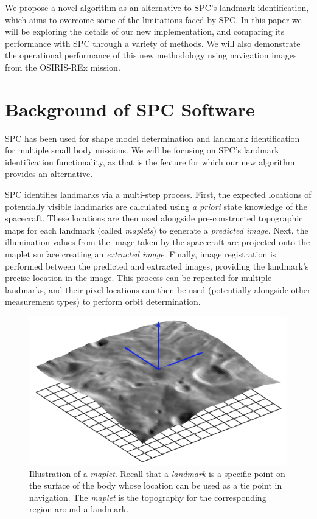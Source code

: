 \documentclass{src/RPI-SIW}
\begin{document}
We propose a novel algorithm as an alternative to SPC's landmark identification, which aims to overcome some of the limitations faced by SPC.  In this paper we will be exploring the details of our new implementation, and comparing its performance with SPC through a variety of methods.  We will also demonstrate the operational performance of this new methodology using navigation images from the OSIRIS-REx mission.

\section*{Background of SPC Software}
SPC has been used for shape model determination and landmark identification for multiple small body missions.\cite{gaskell_nav_overview}  We will be focusing on SPC's landmark identification functionality, as that is the feature for which our new algorithm provides an alternative.

SPC identifies landmarks via a multi-step process.  First, the expected locations of potentially visible landmarks are calculated using \textit{a priori} state knowledge of the spacecraft.  These locations are then used alongside pre-constructed topographic maps for each landmark (called \textit{maplets}) to generate a \textit{predicted image}.  Next, the illumination values from the image taken by the spacecraft are projected onto the maplet surface creating an \textit{extracted image}.  Finally, image registration is performed between the predicted and extracted images, providing the landmark's precise location in the image.  This process can be repeated for multiple landmarks, and their pixel locations can then be used (potentially alongside other measurement types) to perform orbit determination.

\begin{figure}[h]
	\centering
	\includegraphics[width=\columnwidth]{spc_maplet.png}
	\caption{Illustration of a \textit{maplet}.  Recall that a \textit{landmark} is a specific point on the surface of the body whose location can be used as a tie point in navigation.  The \textit{maplet} is the topography for the corresponding region around a landmark.}
	\label{figs::maplet}
\end{figure}
\end{document}
